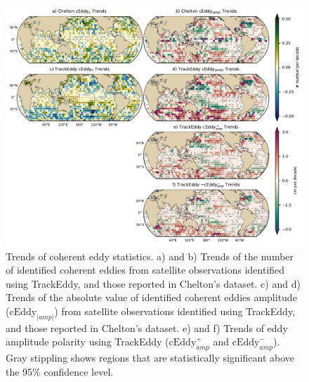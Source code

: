 \documentclass[draft,linenumbers]{agujournal2019}
\newcommand{\cEddy}{\textrm{cEddy}}
\begin{document}
	\begin{figure}
	    \centering
	    \includegraphics[width=1\textwidth]{figures/all_trackeddy_trends_all.pdf}
	    \caption{Trends of coherent eddy statistics. a) and b) Trends of the number of identified coherent eddies from satellite observations identified using TrackEddy, and those reported in Chelton's dataset. c) and d) Trends of the absolute value of identified coherent eddies amplitude ($\cEddy_{|amp|}$) from satellite observations identified using TrackEddy, and those reported in Chelton's dataset. e) and f) Trends of eddy amplitude polarity using TrackEddy ($\cEddy_{amp}^+$ and $\cEddy_{amp}^-$). Gray stippling shows regions that are statistically significant above the 95\% confidence level.}
	    \label{fig:eddy_stats_trends}
	\end{figure}


	
\end{document}
